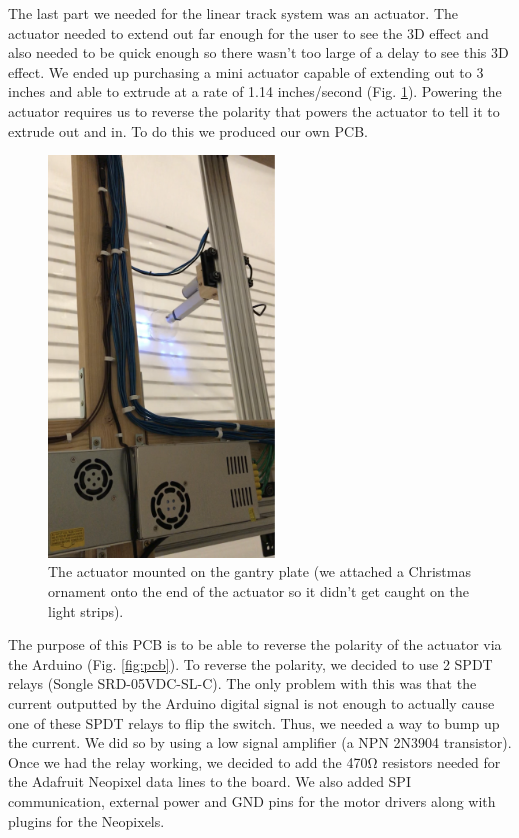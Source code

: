 \documentclass[11pt]{IEEEtran}
\begin{document}
The last part we needed for the linear track system was an actuator. The actuator needed to extend out far enough for the user to see the 3D effect and also needed to be quick enough so there wasn’t too large of a delay to see this 3D effect. We ended up purchasing a mini actuator capable of extending out to 3 inches and able to extrude at a rate of 1.14 inches/second (Fig. \ref{fig:act}). Powering the actuator requires us to reverse the polarity that powers the actuator to tell it to extrude out and in. To do this we produced our own PCB.

\begin{figure}[H]
  \centering
  \includegraphics[width=6cm]{act.png}
  \caption{The actuator mounted on the gantry plate (we attached a Christmas ornament onto the end of the actuator so it didn’t get caught on the light strips).}
  \label{fig:act}
\end{figure}

The purpose of this PCB is to be able to reverse the polarity of the actuator via the Arduino (Fig. \ref{fig:pcb}). To reverse the polarity, we decided to use 2 SPDT relays (Songle SRD-05VDC-SL-C). The only problem with this was that the current outputted by the Arduino digital signal is not enough to actually cause one of these SPDT relays to flip the switch. Thus, we needed a way to bump up the current. We did so by using a low signal amplifier (a NPN 2N3904 transistor).  Once we had the relay working, we decided to add the 470\si{\ohm} resistors needed for the Adafruit Neopixel data lines to the board. We also added SPI communication, external power and GND pins for the motor drivers along with plugins for the Neopixels.
\end{document}
